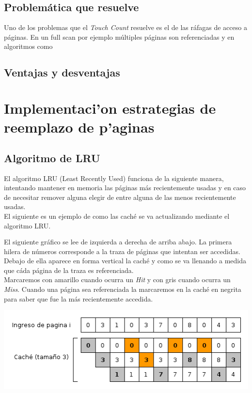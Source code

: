 \documentclass[11pt, a4paper, spanish]{article}
\begin{document}
\subsection{Problem\'atica que resuelve}

Uno de los problemas que el \textit{Touch Count} resuelve es el de las r\'afagas de acceso a p\'aginas. En un full scan por ejemplo m\'ultiples p\'aginas
son referenciadas y en algoritmos como 

\subsection{Ventajas y desventajas}

\newpage 
\section{Implementaci'on estrategias de reemplazo de p'aginas}

\subsection{Algoritmo de LRU}

El algoritmo LRU (Least Recently Used) funciona de la siguiente manera, intentando mantener en memoria las p\'aginas m\'as recientemente usadas
y en caso de necesitar remover alguna elegir de entre alguna de las menos recientemente usadas.\\

El siguiente es un ejemplo de como las cach\'e se va actualizando mediante el algoritmo LRU.

El siguiente gr\'afico se lee de izquierda a derecha de arriba abajo. La primera hilera de n\'umeros corresponde a la traza de p\'aginas que intentan ser 
accedidas. Debajo de ella aparece en forma vertical la cach\'e y como se va llenando a medida que c\'ada p\'agina de la traza es referenciada.\\ 

Marcaremos con amarillo cuando ocurra un \textit{Hit} y con gris cuando ocurra un \textit{Miss}.
Cuando una p\'agina sea referenciada la marcaremos en la cach\'e en negrita para saber que fue la m\'as recientemente accedida.\\

\begin{center}
		\includegraphics[scale=0.65]{diagramas/LRUAlgorithm.png}\\
\end{center}
\end{document}
